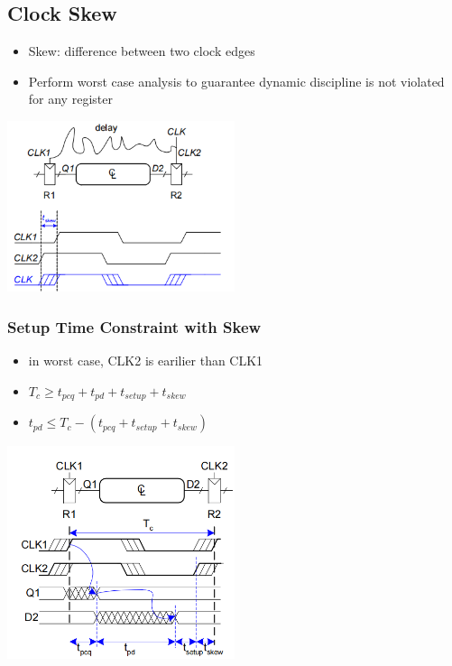 \documentclass[12pt]{article}
\begin{document}
\subsection{Clock Skew}
\begin{itemize}
    \item Skew: difference between two clock edges
    \item Perform worst case analysis to guarantee dynamic discipline is not violated for any register
\end{itemize}
\includegraphics[width=0.5\textwidth]{ClockSkew.png}
\subsubsection{Setup Time Constraint with Skew}
\begin{itemize}
    \item in worst case, CLK2 is earilier than CLK1
    \item $T_c \geq t_{pcq} + t_{pd} + t_{setup} + t_{skew}$
    \item $t_{pd} \leq T_c - (t_{pcq} + t_{setup} + t_{skew})$
\end{itemize}
\includegraphics[width=0.5\textwidth]{ConstraintC.png}
\end{document}
